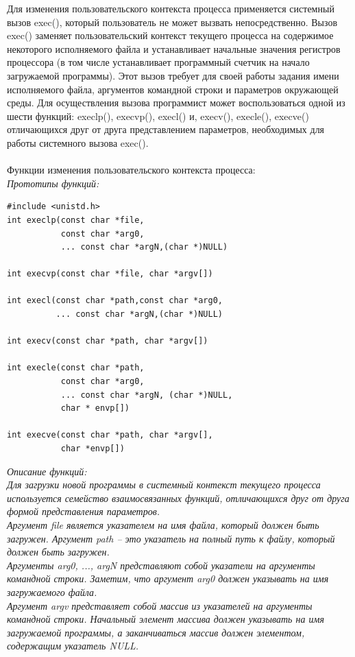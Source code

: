 \documentclass[a4paper]{article}
\begin{document}
Для изменения пользовательского контекста процесса применяется системный вызов exec(), который пользователь не может вызвать непосредственно. Вызов exec() заменяет пользовательский контекст текущего процесса на содержимое некоторого исполняемого файла и устанавливает начальные значения регистров процессора (в том числе устанавливает программный счетчик на начало загружаемой программы). Этот вызов требует для своей работы задания имени исполняемого файла, аргументов командной строки и параметров окружающей среды. Для осуществления вызова программист может воспользоваться одной из шести функций: execlp(), execvp(), execl() и, execv(), execle(), execve() отличающихся друг от друга представлением параметров, необходимых для работы системного вызова exec().\\\\
Функции изменения пользовательского контекста процесса:\\
\sl Прототипы функций:
\begin{verbatim}
#include <unistd.h>
int execlp(const char *file,
           const char *arg0,
           ... const char *argN,(char *)NULL)

int execvp(const char *file, char *argv[])

int execl(const char *path,const char *arg0,
          ... const char *argN,(char *)NULL)

int execv(const char *path, char *argv[])

int execle(const char *path,
           const char *arg0,
           ... const char *argN, (char *)NULL,
           char * envp[])

int execve(const char *path, char *argv[],
           char *envp[])
\end{verbatim}
\sl Описание функций:\\
\rm Для загрузки новой программы в системный контекст текущего процесса используется семейство взаимосвязанных функций, отличающихся друг от друга формой представления параметров. \\
Аргумент file является указателем на имя файла, который должен быть загружен. Аргумент path – это указатель на полный путь к файлу, который должен быть загружен. \\
Аргументы arg0, ..., argN представляют собой указатели на аргументы командной строки. Заметим, что аргумент arg0 должен указывать на имя загружаемого файла. \\
Аргумент argv представляет собой массив из указателей на аргументы командной строки. Начальный элемент массива должен указывать на имя загружаемой программы, а заканчиваться массив должен элементом, содержащим указатель NULL. \\
\end{document}
